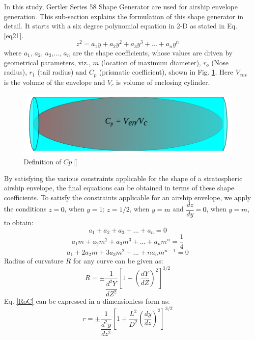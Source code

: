 In this study, Gertler Series 58 Shape Generator are used for airship envelope generation. This sub-section explains the formulation of this shape generator in detail. It starts with a six degree polynomial equation in 2-D as stated in Eq. \ref{eq21}.
\begin{equation}
\label{eq21}
z^2 = a_1y + a_2y^2 + a_3y^3 + ... + a_ny^n	
\end{equation}
where $a_1$, $a_2$, $a_3$,..., $a_n$ are the shape coefficients, whose values are driven by  geometrical parameters, viz., $m$ (location of maximum diameter), $r_o$ (Nose radius), $r_1$ (tail radius) and $C_p$ (prismatic coefficient), shown in Fig. \ref{fig:cp}. Here $ V_{env} $ is the volume of the envelope and $ V_{c} $ is volume of enclosing cylinder.
\begin{figure}[H]
	\centering
	\includegraphics[width=0.7\linewidth]{rnd/c_p_definition.png}
	\caption{Definition of $ Cp $ []}
	\label{fig:cp}
\end{figure}
By satisfying the various constraints applicable for the shape of a stratospheric airship envelope, the final equations can be obtained in terms of these shape coefficients. To satisfy the constraints applicable for an airship envelope, we apply the conditions $z = 0$, when $y = 1$; $z = 1/2$, when $y = m$ and $\dfrac{dz}{dy} = 0$, when $y = m$, to obtain:
\begin{equation}
a_1 + a_2 + a_3 + ... + a_n = 0	
\end{equation}
\begin{equation}
a_1m + a_2m^2 + a_3m^3 + ... + a_nm^n = \frac{1}{4}	
\end{equation}
\begin{equation}
a_1 + 2a_2m + 3a_3m^2 + ... + na_nm^{n-1} =0	
\end{equation}
Radius of curvature $R$ for any curve can be given as:
\begin{equation}
R = \pm \dfrac{1}{\dfrac{d^2Y}{dZ^2}}\left[1+\left(\dfrac{dY}{dZ}\right)^2\right]^{3/2}
\label{RoC}	
\end{equation}
Eq. \ref {RoC} can be expressed in a  dimensionless form as:
\begin{equation}
\label{eq24}
r = \pm \dfrac{1}{\dfrac{d^2y}{dz^2}}\left[1+\frac{L^2}{D^2}\left(\dfrac{dy}{dz}\right)^2\right]^{3/2}	
\end{equation}
